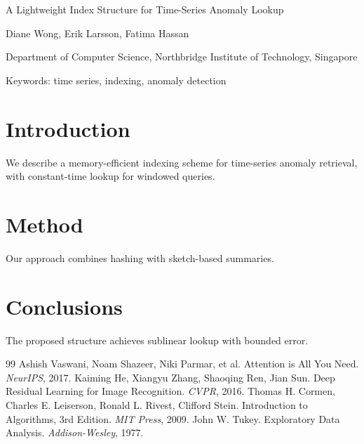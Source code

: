 
A Lightweight Index Structure for Time-Series Anomaly Lookup

Diane Wong, Erik Larsson, Fatima Hassan

Department of Computer Science, Northbridge Institute of Technology, Singapore

Keywords: time series, indexing, anomaly detection

\section{Introduction}
We describe a memory-efficient indexing scheme for time-series anomaly
retrieval, with constant-time lookup for windowed queries.

\section{Method}
Our approach combines hashing with sketch-based summaries.

\section{Conclusions}
The proposed structure achieves sublinear lookup with bounded error.

\begin{thebibliography}{99}
 Ashish Vaswani, Noam Shazeer, Niki Parmar, et al. Attention is All You Need. \emph{NeurIPS}, 2017.
 Kaiming He, Xiangyu Zhang, Shaoqing Ren, Jian Sun. Deep Residual Learning for Image Recognition. \emph{CVPR}, 2016.
 Thomas H. Cormen, Charles E. Leiserson, Ronald L. Rivest, Clifford Stein. Introduction to Algorithms, 3rd Edition. \emph{MIT Press}, 2009.
 John W. Tukey. Exploratory Data Analysis. \emph{Addison-Wesley}, 1977.
\end{thebibliography}
